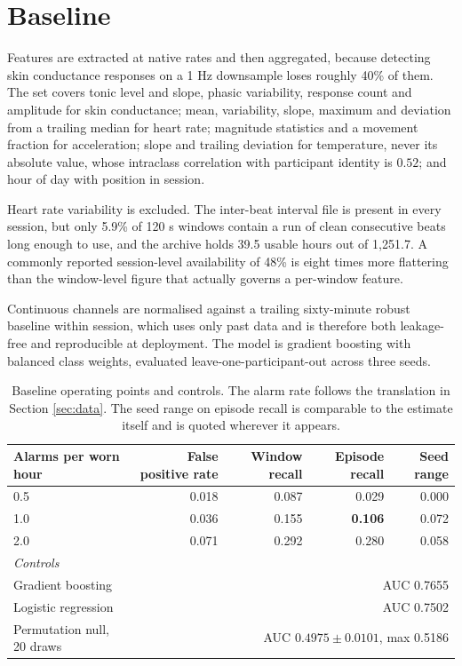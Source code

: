 \section{Baseline}
\label{sec:baseline}

Features are extracted at native rates and then aggregated, because detecting
skin conductance responses on a 1 Hz downsample loses roughly 40\% of them. The
set covers tonic level and slope, phasic variability, response count and
amplitude for skin conductance; mean, variability, slope, maximum and deviation
from a trailing median for heart rate; magnitude statistics and a movement
fraction for acceleration; slope and trailing deviation for temperature, never
its absolute value, whose intraclass correlation with participant identity is
$0.52$; and hour of day with position in session.

Heart rate variability is excluded. The inter-beat interval file is present in
every session, but only 5.9\% of 120 s windows contain a run of clean
consecutive beats long enough to use, and the archive holds 39.5 usable hours
out of 1{,}251.7. A commonly reported session-level availability of 48\% is
eight times more flattering than the window-level figure that actually governs
a per-window feature.

Continuous channels are normalised against a trailing sixty-minute robust
baseline within session, which uses only past data and is therefore both
leakage-free and reproducible at deployment. The model is gradient boosting
with balanced class weights, evaluated leave-one-participant-out across three
seeds.

\begin{table}[t]
\caption{Baseline operating points and controls. The alarm rate follows the
translation in Section \ref{sec:data}. The seed range on episode recall is
comparable to the estimate itself and is quoted wherever it appears.}
\label{tab:baseline}
\centering
\begin{tabular}{lrrrr}
\toprule
Alarms per worn hour & False positive rate & Window recall & Episode recall & Seed range \\
\midrule
0.5 & 0.018 & 0.087 & 0.029 & 0.000 \\
1.0 & 0.036 & 0.155 & \textbf{0.106} & 0.072 \\
2.0 & 0.071 & 0.292 & 0.280 & 0.058 \\
\midrule
\multicolumn{5}{l}{\emph{Controls}} \\
Gradient boosting & \multicolumn{4}{r}{AUC 0.7655} \\
Logistic regression & \multicolumn{4}{r}{AUC 0.7502} \\
Permutation null, 20 draws & \multicolumn{4}{r}{AUC $0.4975 \pm 0.0101$, max 0.5186} \\
\bottomrule
\end{tabular}
\end{table}

